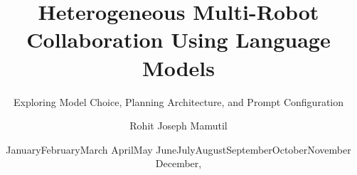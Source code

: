 \documentclass[a4paper,12pt]{article}
\begin{document}

\renewcommand{\today}{\ifcase \month \or January\or February\or March\or %
April\or May \or June\or July\or August\or September\or October\or November\or %
December\fi, \number \year} 

\date{\today}


\title{Heterogeneous Multi-Robot Collaboration Using Language Models}

\subtitle{Exploring Model Choice, Planning Architecture, and Prompt Configuration}




\author{Rohit Joseph Mamutil}




\secrecy{}

\maketitle

\frontmatter

\blankpage
\glsresetall
\begin{abstract}

\end{abstract}
\blankpage
\end{document}
